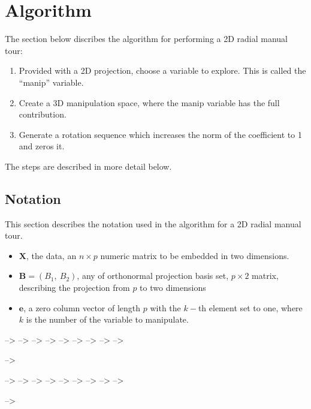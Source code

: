 \documentclass{monashthesis}
\begin{document}
\section{Algorithm}\label{sec:algorithm}

The section below discribes the algorithm for performing a 2D radial
manual tour:

\begin{enumerate}
\def\labelenumi{\arabic{enumi}.}
\tightlist
\item
  Provided with a 2D projection, choose a variable to explore. This is
  called the ``manip'' variable.
\item
  Create a 3D manipulation space, where the manip variable has the full
  contribution.
\item
  Generate a rotation sequence which increases the norm of the
  coefficient to 1 and zeros it.
\end{enumerate}

The steps are described in more detail below.

\subsection{Notation}\label{notation}

This section describes the notation used in the algorithm for a 2D
radial manual tour.

\begin{itemize}
  \item $\textbf{X}$, the data, an $n \times p$ numeric matrix to be embedded in two dimensions.
  \item $\textbf{B} = (B_1,~ B_2)$, any of orthonormal projection basis set, $p \times 2$ matrix, describing the projection from $p$ to two dimensions
  \item $\textbf{e}$, a zero column vector of length $p$ with the $k-$th element set to one, where $k$ is the number of the variable to manipulate.
\end{itemize}

--\textgreater{} --\textgreater{} --\textgreater{} --\textgreater{}
--\textgreater{} --\textgreater{} --\textgreater{} --\textgreater{}
--\textgreater{}

--\textgreater{}

--\textgreater{} --\textgreater{} --\textgreater{} --\textgreater{}
--\textgreater{} --\textgreater{} --\textgreater{} --\textgreater{}
--\textgreater{}

--\textgreater{}
\end{document}
